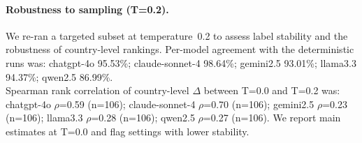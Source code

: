 \paragraph{Robustness to sampling (T=0.2).}
We re-ran a targeted subset at temperature~0.2 to assess label stability and the robustness of country-level rankings.
Per-model agreement with the deterministic runs was: chatgpt-4o 95.53\%; claude-sonnet-4 98.64\%; gemini2.5 93.01\%; llama3.3 94.37\%; qwen2.5 86.99\%.\\
Spearman rank correlation of country-level $\Delta$ between T=0.0 and T=0.2 was: chatgpt-4o $\rho$=0.59 (n=106); claude-sonnet-4 $\rho$=0.70 (n=106); gemini2.5 $\rho$=0.23 (n=106); llama3.3 $\rho$=0.28 (n=106); qwen2.5 $\rho$=0.27 (n=106).
We report main estimates at T=0.0 and flag settings with lower stability.
